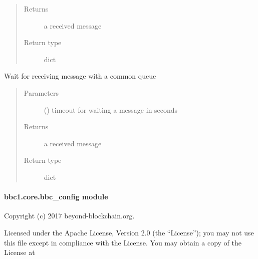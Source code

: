 \documentclass[letterpaper,10pt,english]{sphinxmanual}
\begin{document}
\begin{fulllineitems}
\begin{fulllineitems}
\begin{quote}
\begin{description}
\begin{itemize}
\end{itemize}

\item[{Returns}] \leavevmode
a received message

\item[{Return type}] \leavevmode
dict

\end{description}\end{quote}

\end{fulllineitems}


\begin{fulllineitems}
\label{\detokenize{bbc1.core.bbc_app:bbc1.core.bbc_app.Callback.synchronize}}
Wait for receiving message with a common queue
\begin{quote}\begin{description}
\item[{Parameters}] \leavevmode
{} () \textendash{} timeout for waiting a message in seconds

\item[{Returns}] \leavevmode
a received message

\item[{Return type}] \leavevmode
dict

\end{description}\end{quote}

\end{fulllineitems}


\end{fulllineitems}



\paragraph{bbc1.core.bbc\_config module}
\label{\detokenize{bbc1.core.bbc_config:bbc1-core-bbc-config-module}}\label{\detokenize{bbc1.core.bbc_config:module-bbc1.core.bbc_config}}\label{\detokenize{bbc1.core.bbc_config::doc}}
Copyright (c) 2017 beyond-blockchain.org.

Licensed under the Apache License, Version 2.0 (the “License”);
you may not use this file except in compliance with the License.
You may obtain a copy of the License at
\begin{quote}

\end{quote}
\end{document}
